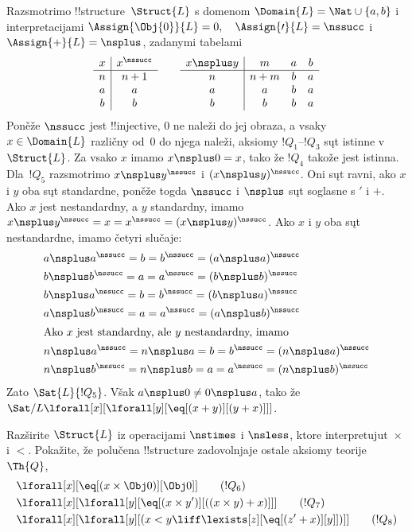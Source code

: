 \documentclass[../../../include/open-logic-section]{subfiles}
\begin{document}
\begin{ex}
 Razsmotrimo !!{structure}~$\Struct{L}$ s
domenom $\Domain{L} = \Nat \cup \{a, b\}$ i interpretacijami
$\Assign{\Obj{0}}{L}=0,\quad \Assign{\prime}{L} = \nssucc$ i
$\Assign{+}{L} = \nsplus$, zadanymi tabelami
\[
\begin{array}{c|c}
  x & x^\nssucc \\
  \hline
  n & n+1 \\
  a & a\\
  b & b
\end{array}
\qquad
\begin{array}{c|ccc}
  x \nsplus y & m & a & b\\
  \hline
  n & n+m & b & a\\
  a & a & b & a\\
  b & b & b & a
\end{array}
\]
Poněže $\nssucc$ jest !!{injective}, $0$ ne naleži do jej obraza, a
vsaky $x \in \Domain{L}$ različny od~$0$ do njega naleži, aksiomy
$!Q_1$--$!Q_3$ sųt istinne v~$\Struct{L}$. Za vsako $x$ imamo
$x \nsplus 0 = x$, tako že $!Q_4$ takože jest istinna. Dla~$!Q_5$
razsmotrimo $x \nsplus y^\nssucc$ i $(x \nsplus y)^\nssucc$. Oni sųt
ravni, ako $x$ i $y$ oba sųt standardne, poněže togda $\nssucc$ i
$\nsplus$ sųt soglasne s $\prime$ i $+$. Ako $x$ jest nestandardny, a
$y$ standardny, imamo $x \nsplus y^\nssucc = x =
x^\nssucc = (x \nsplus y)^\nssucc$. Ako $x$ i $y$ oba sųt
nestandardne, imamo četyri slučaje:
\begin{align*}
&  a \nsplus a^\nssucc  = b = b^\nssucc = (a \nsplus a)^\nssucc\\
&  b \nsplus b^\nssucc  = a = a^\nssucc = (b \nsplus b)^\nssucc\\
&  b \nsplus a^\nssucc  = b = b^\nssucc = (b \nsplus a)^\nssucc\\
&  a \nsplus b^\nssucc  = a = a^\nssucc = (a \nsplus b)^\nssucc\\
\intertext{Ako $x$ jest standardny, ale $y$ nestandardny, imamo}
&  n \nsplus a^\nssucc  = n \nsplus a = b = b^\nssucc = (n \nsplus a)^\nssucc\\
&  n \nsplus b^\nssucc  = n \nsplus b = a = a^\nssucc = (n \nsplus b)^\nssucc
\end{align*}
Zato $\Sat{L}{!Q_5}$. Však $a \nsplus 0 \neq 0 \nsplus a$, tako že
$\Sat/{L}{\lforall[x][\lforall[y][\eq[(x+y)][(y+x)]]]}$.
\end{ex}

\begin{prob}
Razširite $\Struct{L}$ iz 
 operacijami $\nstimes$ i
$\nsless$, ktore interpretujut~$\times$ i $<$. Pokažite, že polučena
!!{structure} zadovolnjaje ostale aksiomy teorije~$\Th{Q}$,
\begin{align*}
& \lforall[x][\eq[(x \times \Obj 0)][\Obj 0]] \tag{$!Q_6$}\\ &
  \lforall[x][\lforall[y][\eq[(x \times y')][((x \times y) + x)]]]
  \tag{$!Q_7$}\\ & \lforall[x][\lforall[y][(x < y \liff \lexists[z][\eq[(z'+x)][y]])]] \tag{$!Q_8$}
\end{align*}
\end{prob}
\end{document}
